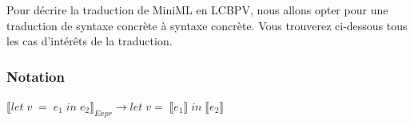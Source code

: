 \documentclass[12pt]{article}
\begin{document}
Pour décrire la traduction de MiniML en LCBPV, nous allons opter pour une traduction de syntaxe concrète à syntaxe concrète.
Vous trouverez ci-dessous tous les cas d'intérêts de la traduction.

\newcommand{\translateNode}[2]{\llbracket #1 \rrbracket_{#2}}
\newcommand{\translateResult}[1]{\llbracket #1 \rrbracket}
\newcommand{\isElemMiniML}[1]{\; \textcolor{Maroon}{#1} \;}
\newcommand{\isElemLCBPV}[1]{\textcolor{ForestGreen}{#1}}
\newcommand{\spaced}[1]{\; #1 \;}
\newcommand{\Tab}{\quad \quad \quad \quad \quad \quad \;}

\hypertarget{notation}{%
      \subsubsection*{Notation}\label{notation}}
$ \translateNode{let \; v \; = \; e_1 \; in \; e_2}{Expr}  \rightarrow let \; v = \; \translateResult{e_1} \; in \; \translateResult{e_2}$
\end{document}
